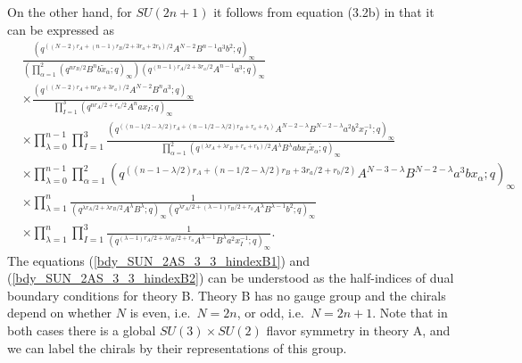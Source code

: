 \documentclass[12pt]{article}
\numberwithin{equation}{section}
\begin{document}
On the other hand, for $SU(2n+1)$ it follows 
from equation (3.2b) in \cite{MR1266569} 
that it can be expressed as
\begin{align}
\label{bdy_SUN_2AS_3_3_hindexB2}
&
\frac{ \left( q^{((N-2)r_A + (n-1)r_B/2 + 3r_a + 2r_b)/2} A^{N-2} B^{n-1} a^3 b^2;q \right)_{\infty} }
 {\left( \prod_{\alpha = 1}^2 \left( q^{nr_B/2} B^n b \tilde{x}_{\alpha}; q \right)_{\infty} \right) \left( q^{(n-1)r_A/2 + 3r_a/2} A^{n-1} a^3; q \right)_{\infty} }
 \nonumber \\
& \times \frac{ \left( q^{((N-2)r_A + nr_B + 3r_a)/2} A^{N-2} B^n a^3;q \right)_{\infty} }
{\prod_{I = 1}^3 (q^{nr_A/2 + r_a/2} A^n a x_I; q)_{\infty}}
 \nonumber \\
& \times \prod_{\lambda = 0}^{n-1} \prod_{I = 1}^3 \frac{ \left( q^{((n-1/2-\lambda/2)r_A + (n-1/2-\lambda/2)r_B + r_a + r_b)} A^{N-2-\lambda} B^{N-2-\lambda} a^2 b^2 x_I^{-1};q \right)_{\infty} }
 { \prod_{\alpha = 1}^2 \left( q^{(\lambda r_A + \lambda r_B + r_a + r_b)/2} A^{\lambda} B^{\lambda} a b x_I \tilde{x}_{\alpha}; q \right)_{\infty} }
 \nonumber \\
& \times \prod_{\lambda = 0}^{n-1} \prod_{\alpha = 1}^2 \left( q^{((n-1-\lambda/2)r_A + (n-1/2-\lambda/2)r_B + 3r_a/2 + r_b/2)} A^{N-3-\lambda} B^{N-2-\lambda} a^3 b x_{\alpha};q \right)_{\infty}
 \nonumber \\
& \times \prod_{\lambda = 1}^{n} \frac{1}
 { \left( q^{\lambda r_A/2 + \lambda r_B/2} A^{\lambda} B^{\lambda}; q \right)_{\infty} \left( q^{\lambda r_A/2 + (\lambda - 1)r_B/2 + r_b} A^{\lambda} B^{\lambda - 1} b^2; q \right)_{\infty} }
 \nonumber \\
& \times \prod_{\lambda = 1}^{n} \prod_{I = 1}^3 \frac{1}{\left( q^{(\lambda - 1)r_A/2 + \lambda r_B/2 + r_a} A^{\lambda - 1} B^{\lambda} a^2 x_I^{-1}; q \right)_{\infty}}. 
\end{align}
The equations  (\ref{bdy_SUN_2AS_3_3_hindexB1}) and (\ref{bdy_SUN_2AS_3_3_hindexB2}) can be understood as the half-indices of dual boundary conditions for theory B. 
Theory B has no gauge group and the chirals depend on whether $N$ is even, i.e.\ $N = 2n$, or odd, i.e.\ $N = 2n + 1$. Note that in both cases there is a
global $SU(3) \times SU(2)$ flavor symmetry in theory A, and we can label the
chirals by their representations of this group.
\end{document}
